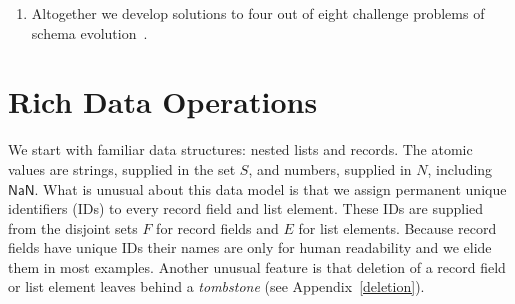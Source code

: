 \documentclass[english,submission]{programming}
\theoremstyle{definition}
\newtheorem*{remark}{Remark}
\newcommand{\mathbox}[1]{\colorbox{black!10}{$#1$\phantom{i\hspace{-3.5pt}}}}
\begin{document}
\begin{enumerate}

\item Altogether we develop solutions to four out of eight challenge problems of schema evolution~\cite{challenge-problems}.

\end{enumerate}







\section{Rich Data Operations}\label{rich-data}

We start with familiar data structures: nested lists and records. The atomic values are strings, supplied in the set \mathbox{S}, and numbers, supplied in \mathbox{N}, including \mathbox{\textsf{NaN}}. What is unusual about this data model is that we assign permanent unique identifiers (IDs) to every record field and list element. These IDs are supplied from the disjoint sets \mathbox{F} for record fields and \mathbox{E} for list elements. Because record fields have unique IDs their names are only for human readability and we elide them in most examples. Another unusual feature is that deletion of a record field or list element leaves behind a \textit{tombstone} (see Appendix~\ref{deletion}).

\end{document}
